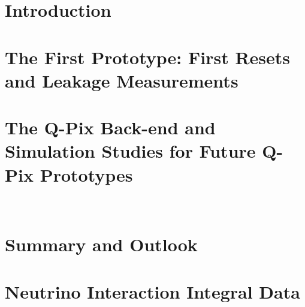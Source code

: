 \documentclass[12pt]{uh_thesis}
\begin{document}
\chapter{Introduction}
\label{chap:intro}




\chapter{The First Prototype: First Resets and Leakage Measurements}
\label{chap:saq}




\chapter{The Q-Pix Back-end and Simulation Studies for Future Q-Pix Prototypes}~\label{chap:sim}


\chapter{Summary and Outlook}
\label{chap:summary}


\printbibliography[heading=bibintoc]

\appendix

% 

% 

\chapter{Neutrino Interaction Integral Data}~\label{app:integral_data}

\end{document}
